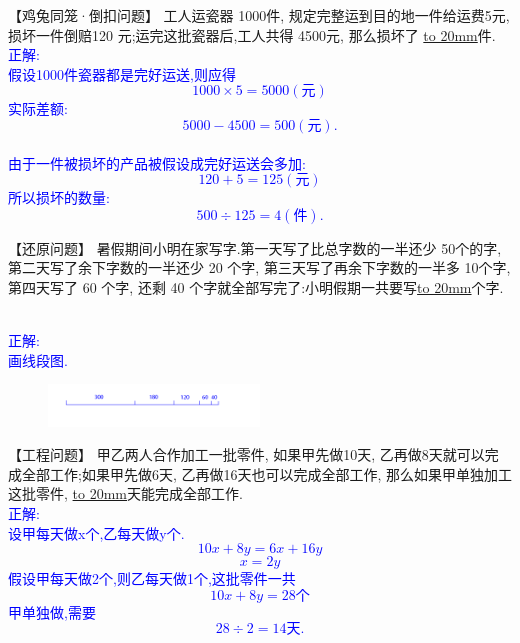 \item {
    【鸡兔同笼·倒扣问题】
    工人运瓷器 1000件, 规定完整运到目的地一件给运费5元, 损坏一件倒赔120 元;运完这批瓷器后,工人共得 4500元, 那么损坏了 \underline{\hbox to 20mm{}}件.
    \ifshowSolution{}
        \fangsong{}\textcolor{blue}{
            \\正解:\\
            假设1000件瓷器都是完好运送,则应得\\
            \[1000\times 5 = 5000(元)\]
            实际差额: 
            \[5000-4500=500(元).\] \\
            由于一件被损坏的产品被假设成完好运送会多加:
            \[120+5=125(元)\]
            所以损坏的数量:
            \[500\div 125 = 4(件).\]
        }
    \else
        \vspace{2cm}
    \fi
}

\item {
    【还原问题】
    暑假期间小明在家写字.第一天写了比总字数的一半还少 50个的字, 第二天写了余下字数的一半还少 20 个字, 第三天写了再余下字数的一半多 10个字, 第四天写了 60 个字, 还剩 40 个字就全部写完了:小明假期一共要写\underline{\hbox to 20mm{}}个字.
    \ifshowSolution{}
        \fangsong{}\textcolor{blue}{
            \\正解:\\
            画线段图.
            \begin{figure}[H] 
                \centering
                \includegraphics[width=0.5\textwidth]{./pics/Chapter_3/seikai_9.png}
            \end{figure}
        }
    \else
        \vspace{2cm}
    \fi
}

\item {
    【工程问题】
    甲乙两人合作加工一批零件, 如果甲先做10天, 乙再做8天就可以完成全部工作;如果甲先做6天, 乙再做16天也可以完成全部工作, 那么如果甲单独加工这批零件, \underline{\hbox to 20mm{}}天能完成全部工作.
    \ifshowSolution{}
        \fangsong{}\textcolor{blue}{
            \\正解:\\
            设甲每天做x个,乙每天做y个.\\
            \[
                10x+8y = 6x+16y
            \]
            \[
                x= 2y
            \]
            假设甲每天做2个,则乙每天做1个,这批零件一共
            \[
                10x+8y = 28 个
            \]
            甲单独做,需要
            \[
                28\div 2 = 14天.
            \]
        }
    \else
        \vspace{2cm}
    \fi
}

